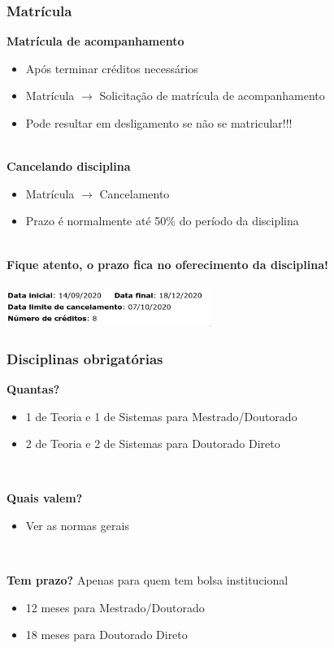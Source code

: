 \documentclass{beamer}
\begin{document}
\begin{frame}
  \frametitle{Matrícula}

  \textbf{Matrícula de acompanhamento}
  \begin{itemize}
    \item Após terminar créditos necessários
    \item Matrícula $\to$ Solicitação de matrícula de acompanhamento
    \item Pode resultar em desligamento se não se matricular!!!
  \end{itemize}~\\

  \textbf{Cancelando disciplina}
  \begin{itemize}
    \item Matrícula $\to$ Cancelamento
    \item Prazo é normalmente até 50\% do período da disciplina
  \end{itemize}~\\

  \textbf{Fique atento, o prazo fica no oferecimento da disciplina!}\\~\\
  \centering\includegraphics[width=0.5\textwidth]{imgs/cancelamento.png}
\end{frame}

\begin{frame}
  \frametitle{Disciplinas obrigatórias}

  \textbf{Quantas?}
  \begin{itemize}
    \item 1 de Teoria e 1 de Sistemas para Mestrado/Doutorado
    \item 2 de Teoria e 2 de Sistemas para Doutorado Direto
  \end{itemize}~\\\pause

  \textbf{Quais valem?}
  \begin{itemize}
    \item Ver as normas gerais
  \end{itemize}~\\\pause

  \textbf{Tem prazo?}\pause{} Apenas para quem tem bolsa institucional
  \begin{itemize}
    \item 12 meses para Mestrado/Doutorado
    \item 18 meses para Doutorado Direto
  \end{itemize}
\end{frame}
\end{document}
